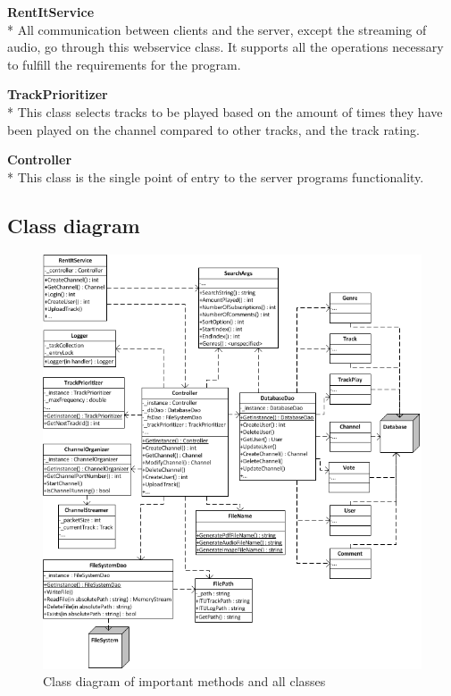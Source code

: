 \documentclass[a4paper,11pt,report]{article}
\begin{document}
\textbf{RentItService} \\*
All communication between clients and the server, except the streaming of audio, go through this webservice class. It supports all the operations necessary to fulfill the requirements for the program. 

\textbf{TrackPrioritizer} \\*
This class selects tracks to be played based on the amount of times they have been played on the channel compared to other tracks, and the track rating.

\textbf{Controller} \\*
This class is the single point of entry to the server programs functionality.

\newpage
\subsection{Class diagram}
\begin{figure}[H]
  \centering
\includegraphics[]{./ClassDiagram.png}
\caption{Class diagram of important methods and all classes}
\end{figure}
\end{document}
